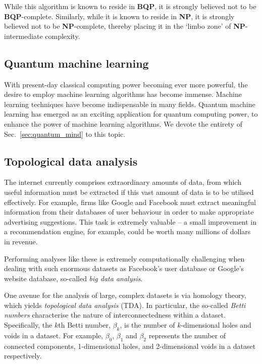 While this algorithm is known to reside in \textbf{BQP}, it is strongly believed not to be \textbf{BQP}-complete. Similarly, while it is known to reside in \textbf{NP}, it is strongly believed not to be \textbf{NP}-complete, thereby placing it in the `limbo zone' of \textbf{NP}-intermediate complexity.

%
%

\subsection{Quantum machine learning} 

With present-day classical computing power becoming ever more powerful, the desire to employ machine learning algorithms has become immense. Machine learning techniques have become indispensable in many fields. Quantum machine learning has emerged as an exciting application for quantum computing power, to enhance the power of machine learning algorithms. We devote the entirety of Sec.~\ref{sec:quantum_mind} to this topic.

%
%

\subsection{Topological data analysis} \label{sec:TDA}

The internet currently comprises extraordinary amounts of data, from which useful information must be extracted if this vast amount of data is to be utilised effectively. For example, firms like Google and Facebook must extract meaningful information from their databases of user behaviour in order to make appropriate advertising suggestions. This task is extremely valuable -- a small improvement in a recommendation engine, for example, could be worth many millions of dollars in revenue.

Performing analyses like these is extremely computationally challenging when dealing with such enormous datasets as Facebook's user database or Google's website database, so-called \textit{big data analysis}.

One avenue for the analysis of large, complex datasets is via homology theory, which yields \textit{topological data analysis} (TDA). In particular, the so-called \textit{Betti numbers} characterise the nature of interconnectedness within a dataset. Specifically, the $k$th Betti number, $\beta_k$, is the number of $k$-dimensional holes and voids in a dataset. For example, $\beta_0$, $\beta_1$ and $\beta_2$ represents the number of connected components, 1-dimensional holes, and 2-dimensional voids in a dataset respectively.


